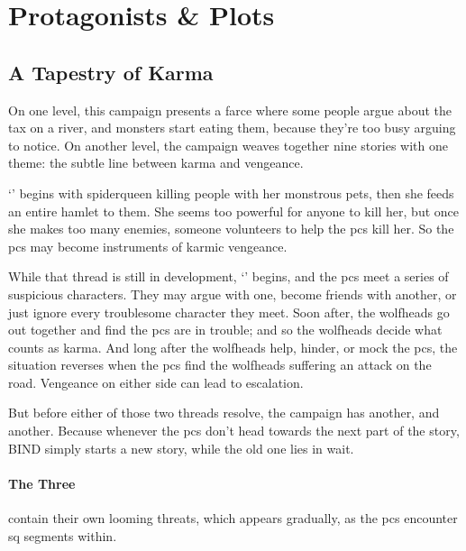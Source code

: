 \chapter{Protagonists \& Plots}
\label{sideQuestIntro}

\section{A Tapestry of Karma}
\label{sqSummaries}

\begin{multicols}{2}


\noindent
On one level, this \gls{campaign} presents a farce where some people argue about the tax on a river, and monsters start eating them, because they're too busy arguing to notice.
On another level, the \gls{campaign} weaves together nine stories with one theme: the subtle line between karma and vengeance.

`' begins with \gls{spiderqueen} killing people with her monstrous pets, then she feeds an entire hamlet to them.
She seems too powerful for anyone to kill her, but once she makes too many enemies, someone volunteers to help the \glspl{pc} kill her.
So the \glspl{pc} may become instruments of karmic vengeance.

While that thread is still in development, `' begins, and the \glspl{pc} meet a series of suspicious characters.
They may argue with one, become friends with another, or just ignore every troublesome character they meet.
Soon after, the \glspl{wolfhead} go out together and find the \glspl{pc} are in trouble; and so the \glspl{wolfhead} decide what counts as karma.
And long after the \glspl{wolfhead} help, hinder, or mock the \glspl{pc}, the situation reverses when the \glspl{pc} find the \glspl{wolfhead} suffering an attack on the road.
Vengeance on either side can lead to escalation.

But before either of those two threads resolve, the \gls{campaign} has another, and another.
Because whenever the \glspl{pc} don't head towards the next part of the story, BIND simply starts a new story, while the old one lies in wait.


\subsubsection{The Three }
contain their own looming threats, which appears gradually, as the \glspl{pc} encounter \gls{sq} \glspl{segment} within.


\end{multicols}
